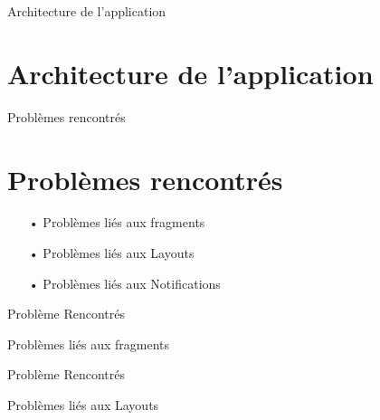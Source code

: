 \documentclass[11pt]{beamer}
\begin{document}
\begin{frame}{Architecture de l'application}
\section{Architecture de l'application}


\end{frame}


\begin{frame}{Problèmes rencontrés}

\section{Problèmes rencontrés}
\begin{itemize}
\item[•] Problèmes liés aux fragments\pause
\item[•] Problèmes liés aux Layouts\pause
\item[•] Problèmes liés aux Notifications
\end{itemize}

\end{frame}



\begin{frame}{Problème Rencontrés}

\begin{mybox}{Problèmes liés aux fragments}
\end{mybox}

\end{frame}

\begin{frame}{Problème Rencontrés}

\begin{mybox}{Problèmes liés aux Layouts}
\end{mybox}

\end{frame}
\end{document}
